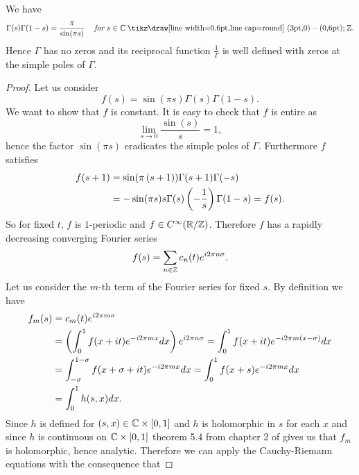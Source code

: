 \begin{theorem}
	We have
\begin{equation*}
	\Gamma(s)\Gamma(1 - s) = \frac{\pi}{\sin(\pi s)} \hsp \textit{ for } s \in \field{C} \mysetminus \field{Z}.
\end{equation*}
	Hence $\Gamma$ has no zeros and its reciprocal function $\frac{1}{\Gamma}$ is well defined with zeros at the simple poles of $\Gamma$.
\end{theorem}
\begin{proof}
	Let us consider
\begin{equation*}
	f(s) = \sin(\pi s) \Gamma(s) \Gamma(1 - s).
\end{equation*}
	We want to show that $f$ is constant. It is easy to check that $f$ is entire as
\begin{equation*}
	\lim\limits_{s \to 0} \frac{\sin(s)}{s} = 1,
\end{equation*}
	hence the factor $\sin(\pi s)$ eradicates the simple poles of $\Gamma$. Furthermore $f$ satisfies
\begin{equation*}
\begin{aligned}
	f(s + 1) 
	&= \sin(\pi \left(s + 1\right)) \Gamma(s + 1) \Gamma(-s) \\ 
	&= -\sin(\pi s) s \Gamma(s) \left(-\frac{1}{s}\right) \Gamma(1 - s) = f(s).
\end{aligned}
\end{equation*}
	So for fixed $t$, $f$ is $1$-periodic and $f \in C^\infty(\mathbb{R} / \mathbb{Z})$. Therefore $f$ has a rapidly decreasing converging Fourier series
\begin{equation*}
	f(s) = \sum _{n \in \mathbb{Z}} c_n(t) e^{i 2 \pi n \sigma}.
\end{equation*}
	Let us consider the $m$-th term of the Fourier series for fixed $s$. By definition we have
\begin{equation*}
\begin{aligned}	
	f_m(s)
	&= c_m(t) e^{i 2 \pi m \sigma} \\
	&= \left(\int _0 ^1 f(x + it) e^{- i 2 \pi m x} dx\right) e^{i 2 \pi n \sigma}= \int _0 ^1 f(x + it) e^{- i 2 \pi m (x - \sigma)} dx \\
	&= \int _{-\sigma} ^{1 - \sigma} f(x + \sigma + it) e^{- i 2 \pi m x} dx = \int _0 ^1 f(x + s) e^{- i 2 \pi m x} dx \\
	&= \int _0 ^1 h(s, x) dx.
\end{aligned}
\end{equation*}
	Since $h$ is defined for $(s, x) \in \mathbb{C} \times \left[0, 1\right]$ and $h$ is holomorphic in $s$ for each $x$ and since $h$ is continuous on $\mathbb{C} \times \left[0, 1\right]$ theorem 5.4 from chapter 2 of \cite{Stein2003} gives us that $f_m$ is holomorphic, hence analytic. Therefore we can apply the Cauchy-Riemann equations with the consequence that

\end{proof}
